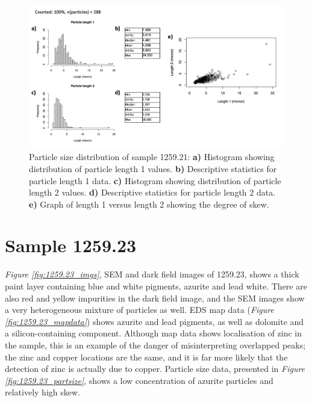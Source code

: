 \begin{figure}[H]
\centering
  \includegraphics[width=\linewidth]{1259-21_partsize}
\caption[Particle size distribution, sample 1259.21.]{Particle size distribution of sample 1259.21: \textbf{a)} Histogram showing distribution of particle length 1 values. \textbf{b)} Descriptive statistics for particle length 1 data. \textbf{c)} Histogram showing distribution of particle length 2 values. \textbf{d)} Descriptive statistics for particle length 2 data. \textbf{e)} Graph of length 1 versus length 2 showing the degree of skew.}
\label{fig:1259.21_partsize}
\end{figure}


\section{Sample 1259.23}

\textit{Figure \ref{fig:1259.23_imgs}}, SEM and dark field images of 1259.23, shows a thick paint layer containing blue and white pigments, azurite and lead white. There are also red and yellow impurities in the dark field image, and the SEM images show a very heterogeneous mixture of particles as well. EDS map data (\textit{Figure \ref{fig:1259.23_mapdata}}) shows azurite and lead pigments, as well as dolomite and a silicon-containing component. Although map data shows localisation of zinc in the sample, this is an example of the danger of misinterpreting overlapped peaks; the zinc and copper locations are the same, and it is far more likely that the detection of zinc is actually due to copper. Particle size data, presented in \textit{Figure \ref{fig:1259.23_partsize}}, shows a low concentration of azurite particles and relatively high skew.


